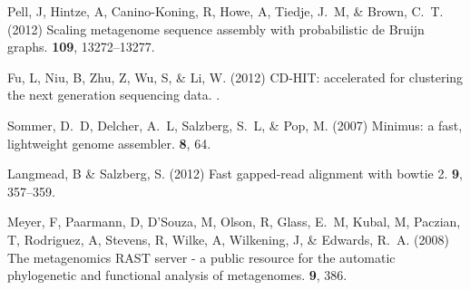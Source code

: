\documentclass{pnastwo}
\begin{document}
\begin{article}
\begin{thebibliography}{1}
Pell, J, Hintze, A, Canino-Koning, R, Howe, A, Tiedje, J.~M,  \& Brown, C.~T.
\newblock (2012) {Scaling metagenome sequence assembly with probabilistic de
  Bruijn graphs}.
 {\bf 109}, 13272--13277.

Fu, L, Niu, B, Zhu, Z, Wu, S,  \& Li, W.
\newblock (2012) {CD-HIT: accelerated for clustering the next generation
  sequencing data.}
.

Sommer, D.~D, Delcher, A.~L, Salzberg, S.~L,  \& Pop, M.
\newblock (2007) Minimus: a fast, lightweight genome assembler.
 {\bf 8}, 64.

Langmead, B \& Salzberg, S.
\newblock (2012) Fast gapped-read alignment with bowtie 2.
 {\bf 9}, 357--359.

Meyer, F, Paarmann, D, D'Souza, M, Olson, R, Glass, E.~M, Kubal, M, Paczian, T,
  Rodriguez, A, Stevens, R, Wilke, A, Wilkening, J,  \& Edwards, R.~A.
\newblock (2008) {The metagenomics RAST server - a public resource for the
  automatic phylogenetic and functional analysis of metagenomes.}
 {\bf 9}, 386.

\end{thebibliography}

\end{article}

\renewcommand{\thepage}{S\arabic{page}}  
\renewcommand{\thesection}{S\arabic{section}}   
\renewcommand{\thetable}{S\arabic{table}}   
\renewcommand{\thefigure}{S\arabic{figure}}
\
\end{document}
